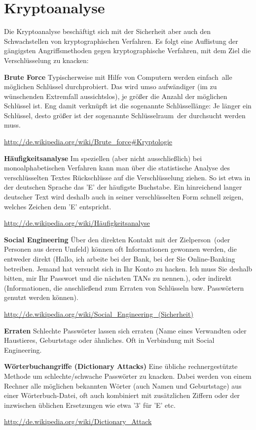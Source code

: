 \section{Kryptoanalyse}

Die Kryptoanalyse beschäftigt sich mit der Sicherheit aber auch den
Schwachstellen von kryptographischen Verfahren. Es folgt eine Auflistung der
gängigsten Angriffsmethoden gegen kryptographische Verfahren, mit dem Ziel die
Verschlüsselung zu knacken:

\begin{compactitem}
\item[\textbf{Brute Force}] Typischerweise mit Hilfe von Computern werden
\glqq einfach\grqq\ alle möglichen Schlüssel durchprobiert. Das wird umso
aufwändiger (im zu wünschenden Extremfall aussichtslos), je größer die Anzahl
der möglichen Schlüssel ist. Eng damit verknüpft ist die sogenannte
Schlüssellänge: Je länger ein Schlüssel, desto größer ist der sogenannte
\glqq Schlüsselraum\grqq\ der durchsucht werden muss.

\url{http://de.wikipedia.org/wiki/Brute_force#Kryptologie}

\item[\textbf{Häufigkeitsanalyse}] Im speziellen (aber nicht ausschließlich)
bei monoalphabetischen Verfahren kann man über die statistische Analyse des
verschlüsselten Textes Rückschlüsse auf die Verschlüsselung ziehen. So ist etwa
in der deutschen Sprache das 'E' der häufigste Buchstabe. Ein hinreichend
langer deutscher Text wird deshalb auch in seiner verschlüsselten Form schnell
zeigen, welches Zeichen dem 'E' entspricht.

\url{http://de.wikipedia.org/wiki/Häufigkeitsanalyse}

\item[\textbf{Social Engineering}] Über den direkten Kontakt mit der
\glqq Zielperson\grqq\ (oder Personen aus deren Umfeld) können oft Informationen
gewonnen werden, die entweder direkt (\glqq Hallo, ich arbeite bei der Bank, bei
der Sie Online-Banking betreiben. Jemand hat versucht sich in Ihr Konto zu
hacken. Ich muss Sie deshalb bitten, mir Ihr Passwort und die nächsten TANs zu
nennen.\grqq ), oder indirekt (Informationen, die anschließend zum Erraten von
Schlüsseln bzw. Passwörtern genutzt werden können).

\url{http://de.wikipedia.org/wiki/Social_Engineering_(Sicherheit)}

\item[\textbf{Erraten}] Schlechte Passwörter lassen sich erraten (Name eines
Verwandten oder Haustieres, Geburtstage oder ähnliches. Oft in Verbindung mit
\glqq Social Engineering\grqq .

\item[\textbf{Wörterbuchangriffe (Dictionary Attacks)}] Eine übliche
rechnergestützte Methode um schlechte/schwache Passwörter zu knacken. Dabei
werden von einem Rechner alle möglichen bekannten Wörter (auch Namen und
Geburtstage) aus einer Wörterbuch-Datei, oft auch kombiniert mit zusätzlichen
Ziffern oder der inzwischen üblichen Ersetzungen wie etwa '3' für 'E' etc.

\url{http://de.wikipedia.org/wiki/Dictionary_Attack}
\end{compactitem}

